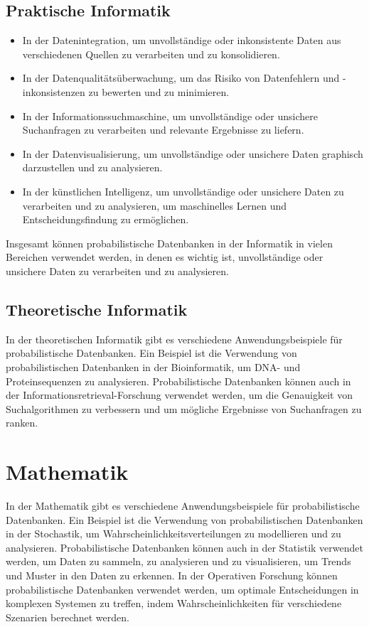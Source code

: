 \subsection{Praktische Informatik}
\begin{itemize}
	\item In der Datenintegration, um unvollständige oder inkonsistente Daten aus verschiedenen Quellen zu verarbeiten und zu konsolidieren.
	
	\item In der Datenqualitätsüberwachung, um das Risiko von Datenfehlern und -inkonsistenzen zu bewerten und zu minimieren.
	
	\item In der Informationssuchmaschine, um unvollständige oder unsichere Suchanfragen zu verarbeiten und relevante Ergebnisse zu liefern.
	
	\item In der Datenvisualisierung, um unvollständige oder unsichere Daten graphisch darzustellen und zu analysieren.
	
	\item In der künstlichen Intelligenz, um unvollständige oder unsichere Daten zu verarbeiten und zu analysieren, um maschinelles Lernen und Entscheidungsfindung zu ermöglichen.
	
\end{itemize}
Insgesamt können probabilistische Datenbanken in der Informatik in vielen Bereichen verwendet werden, in denen es wichtig ist, unvollständige oder unsichere Daten zu verarbeiten und zu analysieren.

\subsection{Theoretische Informatik}
In der theoretischen Informatik gibt es verschiedene Anwendungsbeispiele für probabilistische Datenbanken. Ein Beispiel ist die Verwendung von probabilistischen Datenbanken in der Bioinformatik, um DNA- und Proteinsequenzen zu analysieren. Probabilistische Datenbanken können auch in der Informationsretrieval-Forschung verwendet werden, um die Genauigkeit von Suchalgorithmen zu verbessern und um mögliche Ergebnisse von Suchanfragen zu ranken.

\section{Mathematik}
In der Mathematik gibt es verschiedene Anwendungsbeispiele für probabilistische Datenbanken. Ein Beispiel ist die Verwendung von probabilistischen Datenbanken in der Stochastik, um Wahrscheinlichkeitsverteilungen zu modellieren und zu analysieren. Probabilistische Datenbanken können auch in der Statistik verwendet werden, um Daten zu sammeln, zu analysieren und zu visualisieren, um Trends und Muster in den Daten zu erkennen. In der Operativen Forschung können probabilistische Datenbanken verwendet werden, um optimale Entscheidungen in komplexen Systemen zu treffen, indem Wahrscheinlichkeiten für verschiedene Szenarien berechnet werden.


